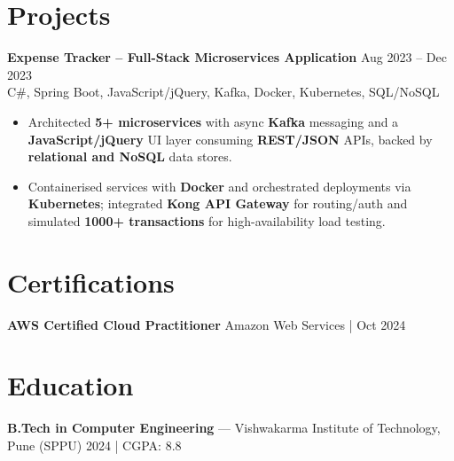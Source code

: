 \documentclass[10pt,letterpaper]{article}
\newcommand{\resumeSubheading}[4]{%
  \textbf{#1} \hfill #2 \\
  #3 \hfill #4 \\
}
\begin{document}
\section*{Projects}

\resumeSubheading{Expense Tracker -- Full-Stack Microservices Application}{Aug 2023 -- Dec 2023}{}{C\#, Spring Boot, JavaScript/jQuery, Kafka, Docker, Kubernetes, SQL/NoSQL}
\begin{itemize}
    \item Architected \textbf{5+ microservices} with async \textbf{Kafka} messaging and a \textbf{JavaScript/jQuery} UI layer consuming \textbf{REST/JSON} APIs, backed by \textbf{relational and NoSQL} data stores.
    \item Containerised services with \textbf{Docker} and orchestrated deployments via \textbf{Kubernetes}; integrated \textbf{Kong API Gateway} for routing/auth and simulated \textbf{1000+ transactions} for high-availability load testing.
\end{itemize}

\section*{Certifications}
\textbf{AWS Certified Cloud Practitioner} \hfill Amazon Web Services \;|\; Oct 2024

\section*{Education}
\textbf{B.Tech in Computer Engineering} --- Vishwakarma Institute of Technology, Pune (SPPU) \hfill 2024 \;|\; CGPA: 8.8
\end{document}
